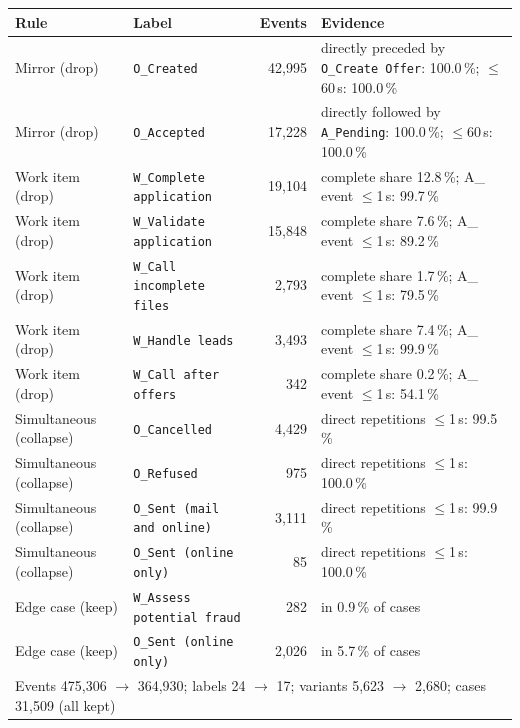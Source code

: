 \begin{tabular}{llrl}
\hline
Rule & Label & Events & Evidence \\
\hline
Mirror (drop) & \texttt{O\_Created} & 42,995 & directly preceded by \texttt{O\_Create Offer}: 100.0\,\%; $\le$60\,s: 100.0\,\% \\
Mirror (drop) & \texttt{O\_Accepted} & 17,228 & directly followed by \texttt{A\_Pending}: 100.0\,\%; $\le$60\,s: 100.0\,\% \\
Work item (drop) & \texttt{W\_Complete application} & 19,104 & complete share 12.8\,\%; A\_ event $\le$1\,s: 99.7\,\% \\
Work item (drop) & \texttt{W\_Validate application} & 15,848 & complete share 7.6\,\%; A\_ event $\le$1\,s: 89.2\,\% \\
Work item (drop) & \texttt{W\_Call incomplete files} & 2,793 & complete share 1.7\,\%; A\_ event $\le$1\,s: 79.5\,\% \\
Work item (drop) & \texttt{W\_Handle leads} & 3,493 & complete share 7.4\,\%; A\_ event $\le$1\,s: 99.9\,\% \\
Work item (drop) & \texttt{W\_Call after offers} & 342 & complete share 0.2\,\%; A\_ event $\le$1\,s: 54.1\,\% \\
Simultaneous (collapse) & \texttt{O\_Cancelled} & 4,429 & direct repetitions $\le$1\,s: 99.5\,\% \\
Simultaneous (collapse) & \texttt{O\_Refused} & 975 & direct repetitions $\le$1\,s: 100.0\,\% \\
Simultaneous (collapse) & \texttt{O\_Sent (mail and online)} & 3,111 & direct repetitions $\le$1\,s: 99.9\,\% \\
Simultaneous (collapse) & \texttt{O\_Sent (online only)} & 85 & direct repetitions $\le$1\,s: 100.0\,\% \\
Edge case (keep) & \texttt{W\_Assess potential fraud} & 282 & in 0.9\,\% of cases \\
Edge case (keep) & \texttt{O\_Sent (online only)} & 2,026 & in 5.7\,\% of cases \\
\hline
\multicolumn{4}{l}{Events 475,306 $\rightarrow$ 364,930; labels 24 $\rightarrow$ 17; variants 5,623 $\rightarrow$ 2,680; cases 31,509 (all kept)} \\
\hline
\end{tabular}
